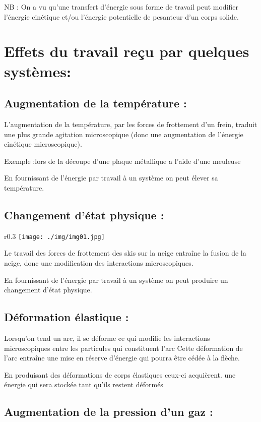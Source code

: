 \documentclass[12pt]{article}
\begin{document}
NB : On a vu qu’une transfert d’énergie sous forme de travail peut
modifier l’énergie cinétique et/ou l’énergie potentielle de
pesanteur d’un corps solide.

\section{Effets du travail reçu par quelques systèmes:}
\subsection{Augmentation de la température : }
L'augmentation de la température, par les forces de frottement d'un frein, traduit une plus grande
agitation microscopique (donc une augmentation de l'énergie cinétique microscopique).

Exemple :lors de la découpe d'une plaque métallique a l'aide d'une meuleuse

En fournissant de l’énergie par travail à un système on peut élever sa température.

\subsection{ Changement d’état physique : }
\begin{wrapfigure}{r}{0.3\textwidth}
    \texttt{[image: ./img/img01.jpg]}
\end{wrapfigure}

Le travail des forces de frottement des skis sur la neige entraîne la fusion de la neige, donc une
modification des interactions microscopiques.

En fournissant de l’énergie par travail à un système on peut produire un changement d’état physique.

\subsection{Déformation élastique :}
Lorsqu'on tend un arc, il se déforme ce qui modifie les interactions microscopiques entre les
particules qui constituent l'arc Cette déformation de l'arc entraîne une mise en réserve d'énergie qui
pourra être cédée à la flèche.

En produisant des déformations de corps élastiques ceux-ci acquièrent.
une énergie qui sera stockée tant qu'ils restent déformés

\subsection{Augmentation de la pression d’un gaz : }
\end{document}

